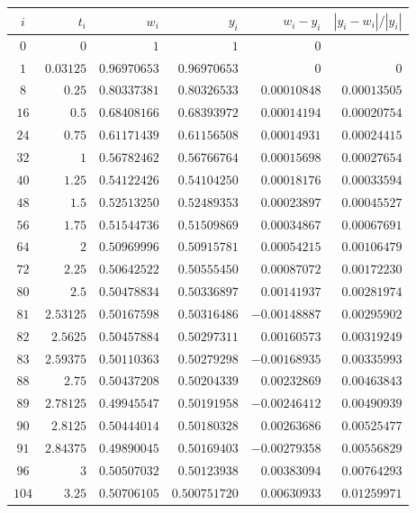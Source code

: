 \begin{egg}
\begin{table}[t]
\begin{center}
{\small
\begin{tabular}{crrrrr}
$i$ & $t_i$ & $w_i$ & $y_i$ & $w_i-y_i$ & $|y_i-w_i|/|y_i|$ \\
\hline
$0$ & $0$ & $1$ & $1$ & $0$ \\
$1$ & $0.03125$ & $0.96970653$ & $0.96970653$ & $0$ & $0$ \\
$8$ & $0.25$ & $0.80337381$ & $0.80326533$ & $0.00010848$ & $0.00013505$ \\
$16$ & $0.5$ & $0.68408166$ & $0.68393972$ & $0.00014194$ & $0.00020754$ \\
$24$ & $0.75$ & $0.61171439$ & $0.61156508$ & $0.00014931$ & $0.00024415$ \\
$32$ & $1$ & $0.56782462$ & $0.56766764$ & $0.00015698$ & $0.00027654$ \\
$40$ & $1.25$ & $0.54122426$ & $0.54104250$ & $0.00018176$ & $0.00033594$ \\
$48$ & $1.5$ & $0.52513250$ & $0.52489353$ & $0.00023897$ & $0.00045527$ \\
$56$ & $1.75$ & $0.51544736$ & $0.51509869$ & $0.00034867$ & $0.00067691$ \\
$64$ & $2$ & $0.50969996$ & $0.50915781$ & $0.00054215$ & $0.00106479$ \\
$72$ & $2.25$ & $0.50642522$ & $0.50555450$ & $0.00087072$ & $0.00172230$ \\
$80$ & $2.5$ & $0.50478834$ & $0.50336897$ & $0.00141937$ & $0.00281974$ \\
$81$ & $2.53125$ & $0.50167598$ & $0.50316486$ & $-0.00148887$ & $0.00295902$ \\
$82$ & $2.5625$ & $0.50457884$ & $0.50297311$ & $0.00160573$ & $0.00319249$ \\
$83$ & $2.59375$ & $0.50110363$ & $0.50279298$ & $-0.00168935$ & $0.00335993$ \\
$88$ & $2.75$ & $0.50437208$ & $0.50204339$ & $0.00232869$ & $0.00463843$ \\
$89$ & $2.78125$ & $0.49945547$ & $0.50191958$ & $-0.00246412$ & $0.00490939$ \\
$90$ & $2.8125$ & $0.50444014$ & $0.50180328$ & $0.00263686$ & $0.00525477$ \\
$91$ & $2.84375$ & $0.49890045$ & $0.50169403$ & $-0.00279358$ & $0.00556829$ \\
$96$ & $3$ & $0.50507032$ & $0.50123938$ & $0.00383094$ & $0.00764293$ \\
$104$ & $3.25$ & $0.50706105$ & $0.500751720$ & $0.00630933$ & $0.01259971$ \\

\end{tabular}}
\end{center}
\end{table}
\end{egg}
